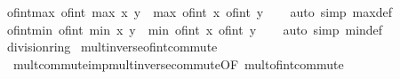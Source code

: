 \begin{isabellebody}
\endisatagproof
{\isafoldproof}%
%
\isadelimproof
\isanewline
%
\endisadelimproof
\isanewline
{}\isamarkupfalse%
\ of{\isacharunderscore}{\kern0pt}int{\isacharunderscore}{\kern0pt}max{\isacharcolon}{\kern0pt}\ {\isachardoublequoteopen}of{\isacharunderscore}{\kern0pt}int\ {\isacharparenleft}{\kern0pt}max\ x\ y{\isacharparenright}{\kern0pt}\ {\isacharequal}{\kern0pt}\ max\ {\isacharparenleft}{\kern0pt}of{\isacharunderscore}{\kern0pt}int\ x{\isacharparenright}{\kern0pt}\ {\isacharparenleft}{\kern0pt}of{\isacharunderscore}{\kern0pt}int\ y{\isacharparenright}{\kern0pt}{\isachardoublequoteclose}\isanewline
%
\isadelimproof
\ \ %
\endisadelimproof
%
\isatagproof
{}\isamarkupfalse%
\ {\isacharparenleft}{\kern0pt}auto\ simp{\isacharcolon}{\kern0pt}\ max{\isacharunderscore}{\kern0pt}def{\isacharparenright}{\kern0pt}%
\endisatagproof
{\isafoldproof}%
%
\isadelimproof
\isanewline
%
\endisadelimproof
\isanewline
{}\isamarkupfalse%
\ of{\isacharunderscore}{\kern0pt}int{\isacharunderscore}{\kern0pt}min{\isacharcolon}{\kern0pt}\ {\isachardoublequoteopen}of{\isacharunderscore}{\kern0pt}int\ {\isacharparenleft}{\kern0pt}min\ x\ y{\isacharparenright}{\kern0pt}\ {\isacharequal}{\kern0pt}\ min\ {\isacharparenleft}{\kern0pt}of{\isacharunderscore}{\kern0pt}int\ x{\isacharparenright}{\kern0pt}\ {\isacharparenleft}{\kern0pt}of{\isacharunderscore}{\kern0pt}int\ y{\isacharparenright}{\kern0pt}{\isachardoublequoteclose}\isanewline
%
\isadelimproof
\ \ %
\endisadelimproof
%
\isatagproof
{}\isamarkupfalse%
\ {\isacharparenleft}{\kern0pt}auto\ simp{\isacharcolon}{\kern0pt}\ min{\isacharunderscore}{\kern0pt}def{\isacharparenright}{\kern0pt}%
\endisatagproof
{\isafoldproof}%
%
\isadelimproof
\isanewline
%
\endisadelimproof
\isanewline
{}\isamarkupfalse%
\isanewline
\isanewline
{}\isamarkupfalse%
\ division{\isacharunderscore}{\kern0pt}ring\isanewline
{}\isanewline
\isanewline
{}\isamarkupfalse%
\ mult{\isacharunderscore}{\kern0pt}inverse{\isacharunderscore}{\kern0pt}of{\isacharunderscore}{\kern0pt}int{\isacharunderscore}{\kern0pt}commute\ {\isacharequal}{\kern0pt}\isanewline
\ \ mult{\isacharunderscore}{\kern0pt}commute{\isacharunderscore}{\kern0pt}imp{\isacharunderscore}{\kern0pt}mult{\isacharunderscore}{\kern0pt}inverse{\isacharunderscore}{\kern0pt}commute{\isacharbrackleft}{\kern0pt}OF\ mult{\isacharunderscore}{\kern0pt}of{\isacharunderscore}{\kern0pt}int{\isacharunderscore}{\kern0pt}commute{\isacharbrackright}{\kern0pt}\isanewline
\isanewline
{}\isamarkupfalse%

\end{isabellebody}
